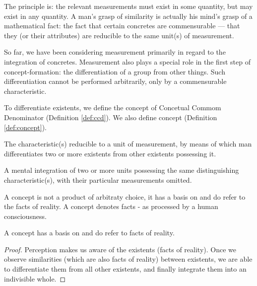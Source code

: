         The principle is: the relevant measurements must exist in some quantity, but may exist in any quantity. A man's grasp of similarity is actually his mind's grasp of a mathematical fact: the fact that certain concretes are commensurable — that they (or their attributes) are reducible to the same unit(s) of measurement.

        So far, we have been considering measurement primarily in regard to the integration of concretes. Measurement also plays a special role in the first step of concept-formation: the differentiation of a group from other things. Such differentiation cannot be performed arbitrarily, only by a commensurable characteristic. 
        
        To differentiate existents, we define the concept of Concetual Commom Denominator (Definition \ref{def:ccd}). We also define concept (Definition \ref{def:concept}).

            \begin{definition}
            \label{def:ccd}
                The characteristic(s) reducible to a unit of measurement, by means of which man differentiates two or more existents from other existents possessing it.
            \end{definition}

            \begin{definition}[Concept]
            \label{def:concept}
                A mental integration of two or more units possessing the same distinguishing characteristic(s), with their particular measurements omitted.
            \end{definition}

        A concept is not a product of arbitraty choice, it has a basis on and do refer to the facts of reality. A concept denotes facts - as processed by a human consciousness.

            \begin{theorem}
                A concept has a basis on and do refer to facts of reality.
            \end{theorem}

            \begin{proof}
                Perception makes us aware of the existents (facts of reality). Once we observe similarities (which are also facts of reality) between existents, we are able to differentiate them from all other existents, and finally integrate them into an indivisible whole.
            \end{proof}


